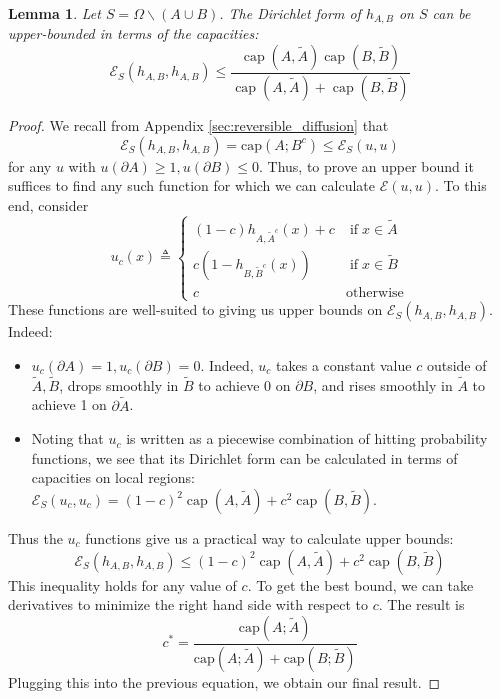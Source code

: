 \documentclass[english, aip, jcp, priprint, graphicx,floatfix]{revtex4-1}
\newcommand{\tmop}[1]{\ensuremath{\operatorname{#1}}}
\newtheorem{lemma}{Lemma}
\theoremstyle{plain}
\theoremstyle{definition}
\theoremstyle{plain}
\newcommand{\capac}[2]{\mathrm{cap}\left(#1;#2\right)}
\begin{document}
\begin{lemma}  Let $S=\Omega \backslash (A\cup B)$.  The Dirichlet form of $h_{A,B}$ on $S$ can be upper-bounded in terms of the capacities:
\[ \mathcal{E}_S(h_{A,B}, h_{A,B}) \leqslant \frac{\tmop{cap} (A, \tilde{A}) \tmop{cap} (B,
\tilde{B})}{\tmop{cap} (A, \tilde{A}) + \tmop{cap} (B, \tilde{B})} \]
\end{lemma}
\begin{proof}
We recall from Appendix \ref{sec:reversible_diffusion} that
%
\[
\mathcal{E}_S(h_{A,B}, h_{A,B}) = \capac{A}{B^c} \leq \mathcal{E}_S (u,u)
\]
%
for any $u$ with $u(\partial A)\geq1,u(\partial B)\leq0$.  Thus, to prove an upper bound it suffices to find any such function for which we can calculate $\mathcal{E}(u,u)$.  To this end, consider
%
\[
u_c (x) \triangleq \left\{ \begin{array}{ll}
(1 - c) h_{A, \widetilde{A}^c} (x) + c & \tmop{if} x \in \tilde{A} \\
c (1 - h_{B, \widetilde{B}^c} (x)) & \tmop{if} x \in \tilde{B} \\
c & \mbox{otherwise}
\end{array} \right. 
\]
%
These functions are well-suited to giving us upper bounds on $\mathcal{E}_S (h_{A,B}, h_{A,B})$.  Indeed:
\begin{itemize}
\item $u_c(\partial A)=1,u_c(\partial B)=0$.  Indeed, $u_c$ takes a constant value $c$ outside of $\tilde A,\tilde B$, drops smoothly in $\tilde B$ to achieve 0 on $\partial B$, and rises smoothly in $\tilde A$ to achieve 1 on $\partial \tilde A$.  
\item Noting that $u_c$ is written as a piecewise combination of hitting probability functions, we see that its Dirichlet form can be calculated in terms of capacities on local regions: $\mathcal{E}_S(u_c,u_c) = (1 - c)^2 \tmop{cap} (A, \tilde{A}) + c^2 \tmop{cap} (B, \tilde{B})$.
\end{itemize}
Thus the $u_c$ functions give us a practical way to calculate upper bounds: 
\[
\mathcal{E}_S(h_{A,B}, h_{A,B})\leq (1 - c)^2 \tmop{cap} (A, \tilde{A}) + c^2 \tmop{cap} (B, \tilde{B})
\]
This inequality holds for any value of $c$.  To get the best bound, we can take derivatives to minimize the right hand side with respect to $c$.  The result is 
\[
c^* = \frac{\capac{A}{\tilde A}}{\capac{A}{\tilde A}+\capac{B}{\tilde B}}
\]
Plugging this into the previous equation, we obtain our final result.
\end{proof}
\end{document}
